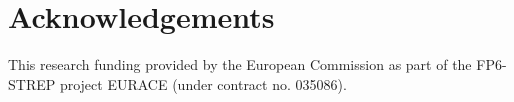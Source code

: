 \documentclass{aamas2009}
\begin{document}

\section{Acknowledgements}
This research funding provided by the European Commission as part of the
FP6-STREP project EURACE (under contract no. 035086).

%

%
%
\end{document}
